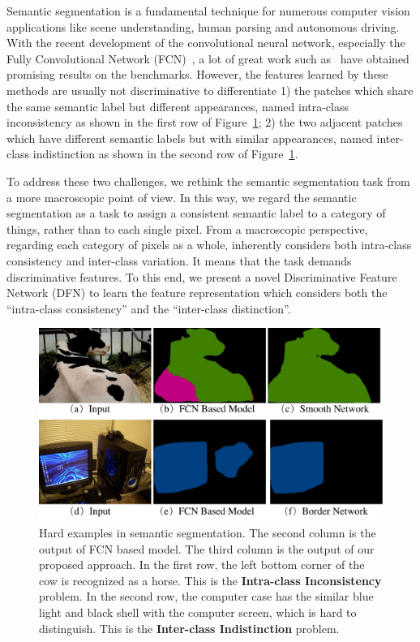 \documentclass[10pt,twocolumn,letterpaper]{article}
\begin{document}
Semantic segmentation is a fundamental technique for numerous computer vision applications like scene understanding, human parsing and autonomous driving. With the recent development of the convolutional neural network, especially the Fully Convolutional Network (FCN)~\cite{Long-CVPR-FCN-2015}, a lot of great work such as~\cite{Zhao-CVPR-PSPNet-2017, Chen-Arxiv-Deeplabv3-2017, Lin-CVPR-Refinenet-2017,Peng-CVPR-Largekernl-2017} have obtained promising results on the benchmarks. However, the features learned by these methods are usually not discriminative to differentiate 1) the patches which share the same semantic label but different appearances, named intra-class inconsistency as shown in the first row of Figure~\ref{fig:issue-def}; 2) the two adjacent patches which have different semantic labels but with similar appearances, named inter-class indistinction as shown in the second row of Figure~\ref{fig:issue-def}. 

To address these two challenges, we rethink the semantic segmentation task from a more macroscopic point of view. In this way, we regard the semantic segmentation as a task to assign a consistent semantic label to a category of things, rather than to each single pixel. From a macroscopic perspective, regarding each category of pixels as a whole, inherently considers both intra-class consistency and inter-class variation. It means that the task demands discriminative features. To this end, we present a novel Discriminative Feature Network (DFN) to learn the feature representation which considers both the ``intra-class consistency'' and the ``inter-class distinction''.

\begin{figure}[t]
\includegraphics[width=\linewidth]{fig1.pdf} 
\vspace{-4mm}
\caption{Hard examples in semantic segmentation. The second column is the output of FCN based model. The third column is the output of our proposed approach. In the first row, the left bottom corner of the cow is recognized as a horse. This is the \textbf{Intra-class Inconsistency} problem. In the second row, the computer case has the similar blue light and black shell with the computer screen, which is hard to distinguish. This is the \textbf{Inter-class Indistinction} problem.}
\label{fig:issue-def}
\centering
\end{figure}
\end{document}
